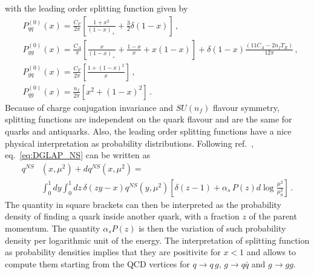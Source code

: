 with the leading order splitting function given by
\begin{align}
    &P_{qq}^{(0)}\left(x\right) = \frac{C_F}{2\pi}\left[\frac{1+x^2}{\left(1-x\right)_+} 
    + \frac{3}{2}\delta\left(1-x\right)\right]\,,\nonumber \\
    &P_{gg}^{(0)}\left(x\right) = \frac{C_A}{\pi}\left[\frac{x}{\left(1-x\right)_+}
    + \frac{1-x}{x} + x\left(1-x\right)\right] 
    +\delta\left(1-x\right)\frac{\left(11C_A - 2n_f T_R\right)}{12\pi}\,, \nonumber \\
    &P_{gq}^{(0)}\left(x\right) = \frac{C_F}{2\pi}\left[\frac{1+\left(1-x\right)^2}{x}\right]\,, \nonumber \\
    &P_{qg}^{(0)}\left(x\right) = \frac{n_f}{2\pi}\left[x^2+\left(1-x\right)^2\right]\,.
\end{align}
Because of charge conjugation invariance and $SU(n_f)$ flavour symmetry, splitting functions are independent on the quark
flavour and are the same for quarks and antiquarks. 
Also, the leading order splitting functions have a nice physical interpretation as probability distributions.
Following ref.~\cite{ALTARELLI1977298}, eq.~\eqref{eq:DGLAP_NS} can be written as
\begin{align}
    q^{NS}&\left(x,\mu^2\right) + dq^{NS}\left(x,\mu^2\right) = \nonumber\\
    &\int_0^1 dy\int_0^1 dz\,\delta\left(zy-x\right) q^{NS}\left(y,\mu^2\right) 
    \left[\delta\left(z-1\right) + \alpha_s\, P\left(z\right) d \log\frac{\mu^2}{\mu_0^2}\right]\,.
\end{align}
The quantity in square brackets can then be interpreted as the probability density of finding a quark
inside another quark, with a fraction $z$ of the parent momentum. The quantity $\alpha_s P\left(z\right)$
is then the variation of such probability density per logarithmic unit of the energy. The interpretation
of splitting function as probability densities implies that they are positivite for $x<1$ and allows to compute
them starting from the QCD vertices for $q\rightarrow q\,g$, $g\rightarrow q\bar{q}$ and $g\rightarrow gg$.  

